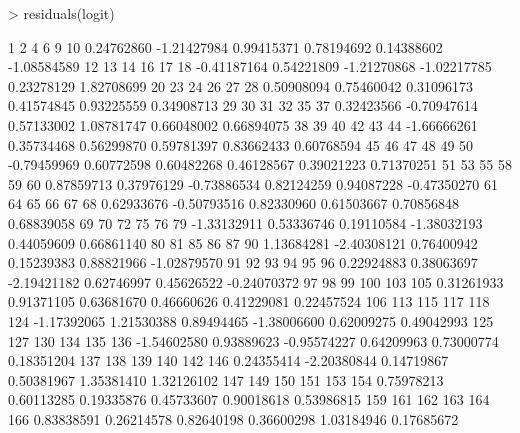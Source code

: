 \documentclass{article}
\begin{document}
\begin{Schunk}
\begin{Sinput}
> residuals(logit)
\end{Sinput}
\begin{Soutput}
          1           2           4           6           9          10 
 0.24762860 -1.21427984  0.99415371  0.78194692  0.14388602 -1.08584589 
         12          13          14          16          17          18 
-0.41187164  0.54221809 -1.21270868 -1.02217785  0.23278129  1.82708699 
         20          23          24          26          27          28 
 0.50908094  0.75460042  0.31096173  0.41574845  0.93225559  0.34908713 
         29          30          31          32          35          37 
 0.32423566 -0.70947614  0.57133002  1.08781747  0.66048002  0.66894075 
         38          39          40          42          43          44 
-1.66666261  0.35734468  0.56299870  0.59781397  0.83662433  0.60768594 
         45          46          47          48          49          50 
-0.79459969  0.60772598  0.60482268  0.46128567  0.39021223  0.71370251 
         51          53          55          58          59          60 
 0.87859713  0.37976129 -0.73886534  0.82124259  0.94087228 -0.47350270 
         61          64          65          66          67          68 
 0.62933676 -0.50793516  0.82330960  0.61503667  0.70856848  0.68839058 
         69          70          72          75          76          79 
-1.33132911  0.53336746  0.19110584 -1.38032193  0.44059609  0.66861140 
         80          81          85          86          87          90 
 1.13684281 -2.40308121  0.76400942  0.15239383  0.88821966 -1.02879570 
         91          92          93          94          95          96 
 0.22924883  0.38063697 -2.19421182  0.62746997  0.45626522 -0.24070372 
         97          98          99         100         103         105 
 0.31261933  0.91371105  0.63681670  0.46660626  0.41229081  0.22457524 
        106         113         115         117         118         124 
-1.17392065  1.21530388  0.89494465 -1.38006600  0.62009275  0.49042993 
        125         127         130         134         135         136 
-1.54602580  0.93889623 -0.95574227  0.64209963  0.73000774  0.18351204 
        137         138         139         140         142         146 
 0.24355414 -2.20380844  0.14719867  0.50381967  1.35381410  1.32126102 
        147         149         150         151         153         154 
 0.75978213  0.60113285  0.19335876  0.45733607  0.90018618  0.53986815 
        159         161         162         163         164         166 
 0.83838591  0.26214578  0.82640198  0.36600298  1.03184946  0.17685672 

\end{Soutput}
\end{Schunk}
\end{document}
